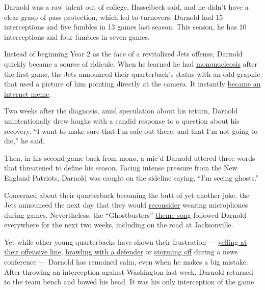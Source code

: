 Darnold was a raw talent out of college, Hasselbeck said, and he didn't
have a clear grasp of pass protection, which led to turnovers. Darnold
had 15 interceptions and five fumbles in 13 games last season. This
season, he has 10 interceptions and four fumbles in seven games.

Instead of beginning Year 2 as the face of a revitalized Jets offense,
Darnold quickly became a source of ridicule. When he learned he had
\href{https://www.nytimes3xbfgragh.onion/2019/09/12/sports/football/mono-sam-darnold.html?rref=collection\%2Fbyline\%2Fdanielle-allentuck\&action=click\&contentCollection=undefined\&region=stream\&module=stream_unit\&version=latest\&contentPlacement=6\&pgtype=collection}{mononucleosis}
after the first game, the Jets announced their quarterback's status with
an odd graphic that used a picture of him pointing directly at the
camera. It instantly
\href{https://twitter.com/Deadspin/status/1174385912840622080}{became an
internet meme}.

Two weeks after the diagnosis, amid speculation about his return,
Darnold unintentionally drew laughs with a candid response to a question
about his recovery. ``I want to make sure that I'm safe out there, and
that I'm not going to die,'' he said.

Then, in his second game back from mono, a mic'd Darnold uttered three
words that threatened to define his season. Facing intense pressure from
the New England Patriots, Darnold was caught on the sideline saying,
``I'm seeing ghosts.''

Concerned about their quarterback becoming the butt of yet another joke,
the Jets announced the next day that they would
\href{https://www.nytimes3xbfgragh.onion/2019/10/22/sports/football/sam-darnold-ghosts.html?rref=collection\%2Fbyline\%2Fdanielle-allentuck\&action=click\&contentCollection=undefined\&region=stream\&module=stream_unit\&version=latest\&contentPlacement=5\&pgtype=collection}{reconsider}
wearing microphones during games. Nevertheless, the ``Ghostbusters''
\href{https://twitter.com/espn/status/1188554780299419648?lang=en}{theme
song} followed Darnold everywhere for the next two weeks, including on
the road at Jacksonville.

Yet while other young quarterbacks have shown their frustration ---
\href{https://twitter.com/NBC4Sports/status/1196180728603656192}{yelling
at their offensive line,}
\href{https://twitter.com/3RonJohnson/status/1195201988163723269}{brawling
with a defender} or
\href{https://www.youtube.com/watch?v=L4F11WVCJPY}{storming off} during
a news conference --- Darnold has remained calm, even when he makes a
big mistake. After throwing an interception against Washington last
week, Darnold returned to the team bench and bowed his head. It was his
only interception of the game.

